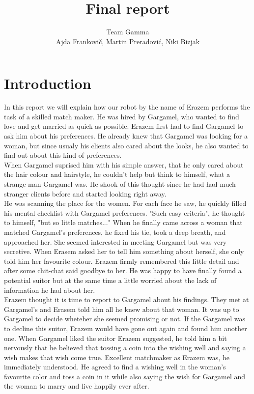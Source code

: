 \documentclass[12pt,a4paper]{article}
\author{Team Gamma \\ {\small Ajda Frankovič, Martin Preradović, Niki Bizjak}}
\title{Final report}
\date{}
\begin{document}
	
	\maketitle

	\tableofcontents
	
	\section{Introduction}
	In this report we will explain how our robot by the name of Erazem performs the task of a skilled match maker. He was hired by Gargamel, who wanted to find love and get married as quick as possible. Erazem first had to find Gargamel to ask him about his preferences. He already knew that Gargamel was looking for a woman, but since usualy his clients also cared about the looks, he also wanted to find out about this kind of preferences. \\
	
	When Gargamel suprised him with his simple answer, that he only cared about the hair colour and hairstyle, he couldn't help but think to himself, what a strange man Gargamel was. He shook of this thought since he had had much stranger clients before and started looking right away. \\

	He was scanning the place for the women. For each face he saw, he quickly filled his mental checklist with Gargamel preferences. "Such easy criteria", he thought to himself, "but so little matches..." When he finally came across a woman that matched Gargamel's preferences, he fixed his tie, took a deep breath, and approached her. She seemed interested in meeting Gargamel but was very secretive. When Erasem asked her to tell him something about herself, she only told him her favourite colour. Erazem firmly remembered this little detail and after some chit-chat said goodbye to her. He was happy to have finally found a potential suitor but at the same time a little worried about the lack of information he had about her. \\
	
	Erazem thought it is time to report to Gargamel about his findings. They met at Gargamel's and Erasem told him all he knew about that woman. It was up to Gargamel to decide wheteher she seemed promising or not. If the Gargamel was to decline this suitor, Erazem would have gone out again and found him another one. When Gargamel liked the suitor Erazem suggested, he told him a bit nervously that he believed that tossing a coin into the wishing well and saying a wish makes that wish come true. Excellent matchmaker as Erazem was, he immediately understood. He agreed to find a wishing well in the woman's favourite color and toss a coin in it while also saying the wish for Gargamel and the woman to marry and live happily ever after. \\
\end{document}
